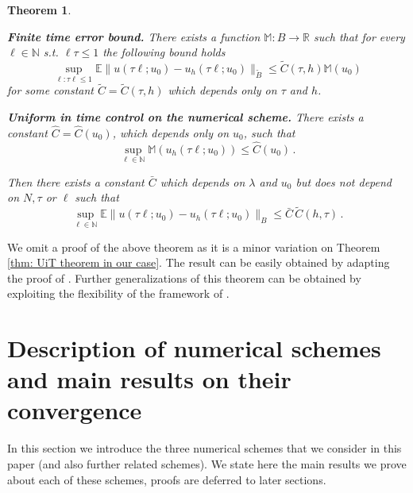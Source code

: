 \documentclass[reqno, 11pt]{amsart}
\theoremstyle{plain}
\newtheorem{theorem}{Theorem}[section]
\theoremstyle{definition}
\theoremstyle{remark}
\numberwithin{equation}{section}
\numberwithin{theorem}{section}
\newcommand{\R}{\mathbb{R}}
\newcommand{\N}{\mathbb{N}}
\begin{document}
{\begin{theorem}
\begin{enumerate}[label=\textnormal{[A\arabic*]},ref={[A\arabic*]}]
\item\label{Finite time estimate U}{\bf Finite time error bound.}
There exists a function $\mathbb M: B \rightarrow \R$ such that for every $\ell \in \mathbb N$ s.t. $\ell\tau \leq 1$ the following bound holds
\begin{equation}\label{eqn: Finite time estimate U}
    \sup_{\ell: \tau \ell \leq 1} 
    \mathbb E \|u(\tau \ell;u_0) - u_h( \tau \ell;u_0)\|_{\tilde B} \leq \tilde{C}(\tau, h) \mathbb M(u_0)
\end{equation}
for some constant $\tilde C= \tilde C (\tau, h)$ which depends only on $\tau$ and $h$.  

\item\label{Uniform in time moment bound U}{\bf Uniform in time control on the numerical scheme.}
There exists a constant $\hat C=\hat C(u_0)$, which depends only on $u_0$, such that
$$
\sup_{\ell \in \N} \mathbb M (u_h(\tau\ell; u_0)) \leq \hat C(u_0) \,.
$$
\end{enumerate}

Then there exists a constant $\bar C$ which depends on $\lambda$ and $u_0$ but does not depend on $N, \tau $ or $ \ell$ such that 
\begin{equation}
    \sup_{\ell \in \mathbb N} 
    \mathbb E \|u(\tau \ell;u_0) - u_h(\tau \ell;u_0)\|_B \leq \bar C \, \tilde{C}(h, \tau) \,.
\end{equation}

\end{theorem}
We omit a  proof of the above theorem as it is a minor variation on Theorem \ref{thm: UiT theorem in our case}.  The result can be easily obtained by adapting the proof of  \cite[Theorem 1.1]{schuh2024conditions}. Further generalizations of this theorem can be  obtained by exploiting the flexibility of the framework of \cite{schuh2024conditions}.






 

\section{Description of numerical schemes and main results on their convergence}\label{sec: numerical schemes}
In this section we introduce the three numerical schemes that we consider in this paper (and also further related schemes). We state here the main results we prove about each of these schemes, proofs are deferred to later sections.  

}
\end{document}
